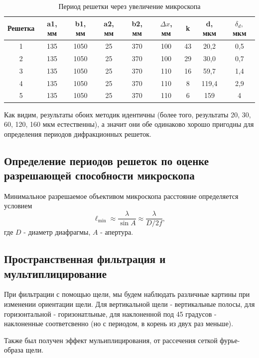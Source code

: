 \documentclass[a4paper, 12pt]{article}
\begin{document}
\begin{table}[h]
\begin{center}
\caption{Период решетки через увеличение микроскопа}
\begin{tabular}{|c|c|c|c|c|c|c|c|c|}
\hline
Решетка & a1, мм  & b1, мм   & a2, мм & b2, мм  & $\Delta x$, мм   & k  & d, мкм    & $\delta_{d},$ мкм   \\ \hline
1         & 135 & 1050 & 25 & 370 & 100 & 43 & 20,2  & 0,5 \\ \hline
2         & 135 & 1050 & 25 & 370 & 100 & 29 & 30,0  & 0,7 \\ \hline
3         & 135 & 1050 & 25 & 370 & 110 & 16 & 59,7  & 1,4 \\ \hline
4         & 135 & 1050 & 25 & 370 & 110 & 8  & 119,4 & 2,9 \\ \hline
5         & 135 & 1050 & 25 & 370 & 110 & 6  & 159   & 4   \\ \hline
\end{tabular}
\end{center}
\end{table}
Как видим, результаты обоих методик идентичны (более того, результаты 20, 30, 60, 120, 160 мкм естественны), а значит они обе одинаково хорошо пригодны для определения периодов дифракционных решеток.

\subsection{Определение периодов решеток по оценке разрешающей способности микроскопа}

Минимальное разрешаемое объективом микроскопа расстояние определяется условием
$$\ell_{\min } \approx \frac{\lambda}{\sin A} \approx \frac{\lambda}{D / 2 f},$$
где $D$ - диаметр диафрагмы, $A$ - апертура.


\subsection{Пространственная фильтрация и мультиплицирование}
При фильтрации с помощью щели, мы будем наблюдать различные картины при изменении ориентации щели. Для вертикальной щели -  вертикальные полосы, для горизонтальной - горизонатльные, для наклоненной под 45 градусов - наклоненные соответсвенно (но с периодом, в корень из двух раз меньше). 

Также был получен эффект мульиплицирования, от рассечения сеткой фурье-образа щели. 

\end{document}
